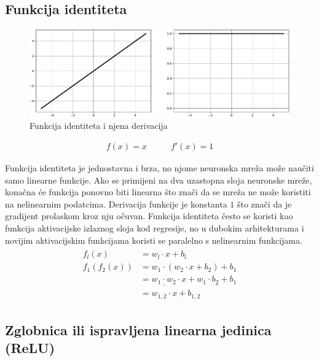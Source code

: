 \documentclass[times, utf8, numeric, diplomski]{fer}
\begin{document}
\subsection{Funkcija identiteta}

\begin{figure}[H]
\includegraphics[width=\textwidth]{func_Identity.pdf}
\centering
\caption{Funkcija identiteta i njena derivacija}
\label{fig:identity}
\end{figure}

\begin{equation}
\begin{split}
f(x) = x
\end{split}
\qquad
\begin{split}
f'(x) = 1
\end{split}
\end{equation}

Funkcija identiteta je jednostavna i brza, no njome neuronska mreža može naučiti samo linearne funkcije. Ako se primijeni na dva uzastopna sloja neuronske mreže, konačna će funkcija ponovno biti linearna što znači da se mreža ne može koristiti na nelinearnim podatcima. Derivacija funkcije je konstanta $1$ što znači da je gradijent prolaskom kroz nju očuvan. Funkcija identiteta često se koristi kao funkcija aktivacijske izlaznog sloja kod regresije, no u dubokim arhitekturama \citep{resnet,densenet} i novijim aktivacijskim funkcijama \citep{swish,elish} koristi se paralelno s nelinearnim funkcijama.
\begin{align}
\begin{split}
f_l(x) &= w_l \cdot x + b_l \\
f_1(f_2(x)) &= w_1 \cdot (w_2 \cdot x + b_2) + b_1 \\
&= \underline{w_1 \cdot w_2} \cdot x + \underline{w_1 \cdot b_2 + b_1} \\
&= w_{1,2} \cdot x + b_{1,2}
\end{split}
\end{align}

\subsection{Zglobnica ili ispravljena linearna jedinica (ReLU)}
\label{func:relu}
\end{document}
